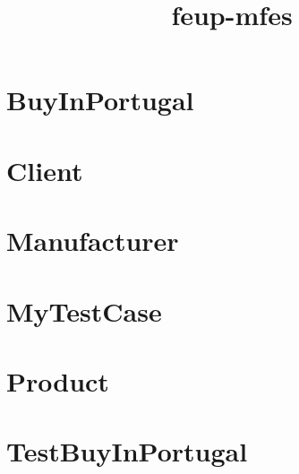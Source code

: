 \documentclass{article}
\begin{document}
\title{feup-mfes}
\author{}
\maketitle
\tableofcontents

\section{BuyInPortugal}

\section{Client}

\section{Manufacturer}

\section{MyTestCase}

\section{Product}

\section{TestBuyInPortugal}

\end{document}
